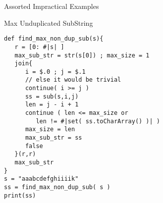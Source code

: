 \begin{section}{Assorted Impractical Examples}
\begin{subsection}{Max Unduplicated SubString}
\begin{center}\begin{minipage}{\linewidth}
\begin{lstlisting}[style=JexlStyle]
def find_max_non_dup_sub(s){
   r = [0: #|s| ] 
   max_sub_str = str(s[0]) ; max_size = 1  
   join{
      i = $.0 ; j = $.1 
      // else it would be trivial 
      continue( i >= j )
      ss = sub(s,i,j)
      len = j - i + 1
      continue ( len <= max_size or 
         len != #|set( ss.toCharArray() )| )
      max_size = len  
      max_sub_str = ss 
      false 
   }(r,r)
   max_sub_str 
}
s = "aaabcdefghiiiik"
ss = find_max_non_dup_sub( s )
print(ss)
\end{lstlisting}  
\end{minipage}\end{center} 

\end{subsection}

\end{section}





